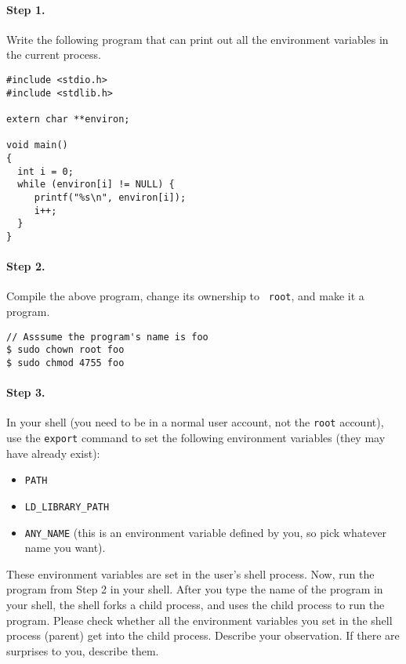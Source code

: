 \paragraph{Step 1.} Write the following program that can print out all
the environment variables in the current process.

\begin{lstlisting}
#include <stdio.h>
#include <stdlib.h>

extern char **environ;

void main()
{ 
  int i = 0;
  while (environ[i] != NULL) {
     printf("%s\n", environ[i]);
     i++;
  }
}
\end{lstlisting}


\paragraph{Step 2.} Compile the above program, change its ownership to {\tt
root}, and make it a \setuid program. 

\begin{lstlisting}
// Asssume the program's name is foo
$ sudo chown root foo
$ sudo chmod 4755 foo
\end{lstlisting}
 


\paragraph{Step 3.} In your shell (you need to be in a normal user account,
not the {\tt root} account), use the {\tt export} command to set the
following environment variables (they may have already exist):

\begin{itemize}[noitemsep]
\item {\tt PATH}
\item {\tt LD\_LIBRARY\_PATH}
\item {\tt ANY\_NAME} (this is an environment variable defined by you, so
pick whatever name you want).
\end{itemize}


These environment variables are set in the user's shell process.
Now, run the \setuid program from Step 2 in your shell. After you type the
name of the program in your shell, the shell forks a child process,
and uses the child process to run the program. Please check whether all the
environment variables you set in the shell process (parent) get into
the \setuid child process.  Describe your observation. If there are 
surprises to you, describe them.  



